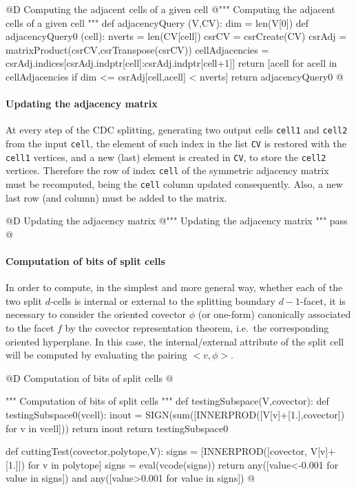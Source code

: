 \documentclass[11pt,oneside]{article}	%
\begin{document}
@D Computing the adjacent cells of a given cell
@{""" Computing the adjacent cells of a given cell """
def adjacencyQuery (V,CV):
	dim = len(V[0])
	def adjacencyQuery0 (cell):
		nverts = len(CV[cell])
		csrCV =  csrCreate(CV)
		csrAdj = matrixProduct(csrCV,csrTranspose(csrCV))
		cellAdjacencies = csrAdj.indices[csrAdj.indptr[cell]:csrAdj.indptr[cell+1]]
		return [acell for acell in cellAdjacencies if dim <= csrAdj[cell,acell] < nverts]
	return adjacencyQuery0
@}

\paragraph{Updating the adjacency matrix}
At every step of the CDC splitting, generating two output cells \texttt{cell1} and  \texttt{cell2} from the input  \texttt{cell}, the element of such index in the list \texttt{CV} is restored with the \texttt{cell1} vertices, and a new (last) element is created in \texttt{CV}, to store the \texttt{cell2} vertices.
Therefore the row of index \texttt{cell} of the symmetric  adjacency matrix must be recomputed, being the \texttt{cell} column updated consequently. Also, a new last row (and column) must be added to the matrix. 

@D Updating the adjacency matrix
@{""" Updating the adjacency matrix """
pass
@}



\paragraph{Computation of bits of split cells}

In order to compute, in the simplest and more general way, whether each of the two split $d$-cells is internal or external to the splitting boundary $d-1$-facet, it is necessary to consider the oriented covector $\phi$ (or one-form) canonically associated to the facet $f$ by the covector representation theorem, i.e.~the corresponding oriented hyperplane. In this case, the internal/external attribute of the split cell will be computed by evaluating the pairing $<v,\phi>$.

@D Computation of bits of split cells
@{""" Computation of bits of split cells """
def testingSubspace(V,covector):
	def testingSubspace0(vcell):
		inout = SIGN(sum([INNERPROD([V[v]+[1.],covector]) for v in vcell]))
		return inout
	return testingSubspace0
	
def cuttingTest(covector,polytope,V):
	signs = [INNERPROD([covector, V[v]+[1.]]) for v in polytope]
	signs = eval(vcode(signs))
	return any([value<-0.001 for value in signs]) and any([value>0.001 for value in signs])
@}
\end{document}
